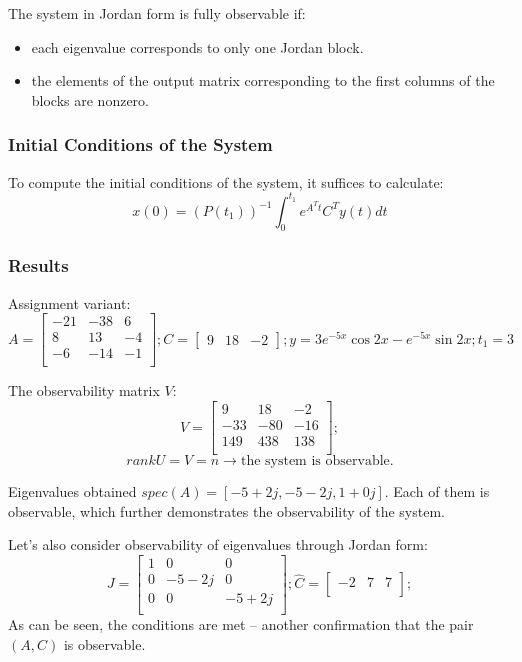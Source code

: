 The system in Jordan form is fully observable if:
\begin{itemize}
    \item each eigenvalue corresponds to only one Jordan block.
    \item the elements of the output matrix corresponding to the first columns of the blocks are nonzero.
\end{itemize}

\subsubsection{Initial Conditions of the System}
To compute the initial conditions of the system, it suffices to calculate:
\[x(0) = (P(t_1))^{-1} \int_{0}^{t_1} e^{A^T t} C^T y(t) dt\]


\subsubsection{Results}
Assignment variant:
\[ A = \begin{bmatrix}
        -21 & -38 & 6 \\
        8 & 13 & -4 \\
        -6 & -14 & -1 \\
        \end{bmatrix}; 
        C = \begin{bmatrix}
                9  & 18 & -2
                \end{bmatrix}; 
        y = 3 e^{-5x}\cos{2x} - e^{-5x}\sin{2x}; 
        t_1 = 3
\]

The observability matrix \(V\):
\[ V = \begin{bmatrix}
        9 & 18 & -2 \\
        -33 & -80 & -16 \\
        149 & 438 & 138 \\
        \end{bmatrix};
\]
\[rankU = V = n \rightarrow \text{the system is observable.}\]

Eigenvalues obtained \(spec(A) = [-5 + 2j, -5 - 2j, 1+0j]\). Each of them is observable, which further demonstrates the observability of the system.

Let's also consider observability of eigenvalues through Jordan form:
\[
        J = \begin{bmatrix}
                1 & 0 & 0 \\
                0 & -5 - 2j & 0 \\
                0 & 0 & -5 + 2j \\
                \end{bmatrix};
        \hat{C} = \begin{bmatrix}
                -2 &
                7 &
                7 \\
                \end{bmatrix};
\]
As can be seen, the conditions are met -- another confirmation that the pair \((A, C)\) is observable.

